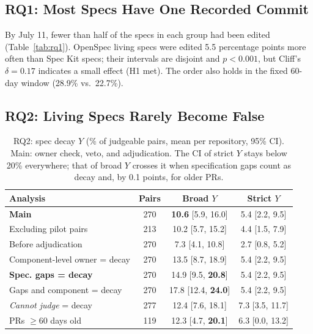 \documentclass[10pt,conference]{IEEEtran}
\begin{document}
\subsection{RQ1: Most Specs Have One Recorded Commit}
By July 11, fewer than half of the specs in each group had been edited (Table~\ref{tab:rq1}). OpenSpec living specs were edited 5.5 percentage points more often than Spec Kit specs; their intervals are disjoint and $p < 0.001$, but Cliff's $\delta = 0.17$ indicates a small effect (H1 met). The order also holds in the fixed 60-day window (28.9\% vs.\ 22.7\%).

\subsection{RQ2: Living Specs Rarely Become False}
\begin{table}[t]
\centering
\caption{RQ2: spec decay $Y$ (\% of judgeable pairs, mean per repository, 95\% CI). Main: owner check, veto, and adjudication. The CI of strict $Y$ stays below 20\% everywhere; that of broad $Y$ crosses it when specification gaps count as decay and, by 0.1 points, for older PRs.}
\label{tab:decay}
\footnotesize
\setlength{\tabcolsep}{3pt}
\begin{tabular}{@{}lccc@{}}
\toprule
Analysis & Pairs & Broad $Y$ & Strict $Y$ \\
\midrule
\textbf{Main} & 270 & \textbf{10.6} [5.9, 16.0] & 5.4 [2.2, 9.5] \\
Excluding pilot pairs & 213 & 10.2 [5.7, 15.2] & 4.4 [1.5, 7.9] \\
Before adjudication & 270 & 7.3 [4.1, 10.8] & 2.7 [0.8, 5.2] \\
Component-level owner = decay & 270 & 13.5 [8.7, 18.9] & 5.4 [2.2, 9.5] \\
\textbf{Spec. gaps = decay} & 270 & 14.9 [9.5, \textbf{20.8}] & 5.4 [2.2, 9.5] \\
Gaps and component = decay & 270 & 17.8 [12.4, \textbf{24.0}] & 5.4 [2.2, 9.5] \\
\emph{Cannot judge} = decay & 277 & 12.4 [7.6, 18.1] & 7.3 [3.5, 11.7] \\
PRs $\ge$60 days old & 119 & 12.3 [4.7, \textbf{20.1}] & 6.3 [0.0, 13.2] \\
\bottomrule
\end{tabular}
\end{table}
\end{document}
